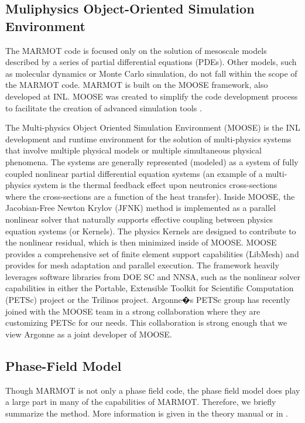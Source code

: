 \documentclass[letter,12pt,fleqn]{article}
\begin{document}
\subsection{Muliphysics Object-Oriented Simulation Environment}
\label{sec:moose}
The MARMOT code is focused only on the solution of mesoscale models described by a series of partial differential equations (PDEs). Other models, such as molecular dynamics or Monte Carlo simulation, do not fall within the scope of the MARMOT code. MARMOT is built on the MOOSE framework, also developed at INL. MOOSE was created to simplify the code development process to facilitate the creation of advanced simulation tools \citep{gaston08}.

The Multi-physics Object Oriented Simulation Environment (MOOSE) is the INL development and runtime environment for the solution of multi-physics systems that involve multiple physical models or multiple simultaneous physical phenomena. The systems are generally represented (modeled) as a system of fully coupled nonlinear partial differential equation systems (an example of a multi-physics system is the thermal feedback effect upon neutronics cross-sections where the cross-sections are a function of the heat transfer). Inside MOOSE, the Jacobian-Free Newton Krylov (JFNK) method is implemented as a parallel nonlinear solver that naturally supports effective coupling between physics equation systems (or Kernels). The physics Kernels are designed to contribute to the nonlinear residual, which is then minimized inside of MOOSE. MOOSE provides a comprehensive set of finite element support capabilities (LibMesh) and provides for mesh adaptation and parallel execution. The framework heavily leverages software libraries from DOE SC and NNSA, such as the nonlinear solver capabilities in either the Portable, Extensible Toolkit for Scientific Computation (PETSc) project or the Trilinos project. Argonne�s PETSc group has recently joined with the MOOSE team in a strong collaboration where they are customizing PETSc for our needs. This collaboration is strong enough that we view Argonne as a joint developer of MOOSE.

\subsection{Phase-Field Model}
\label{sec:phasefield}
Though MARMOT is not only a phase field code, the phase field model does play a large part in many of the capabilities of MARMOT. Therefore, we briefly summarize the method. More information is given in the theory manual or in \citet{chen2002}. 
\end{document}
